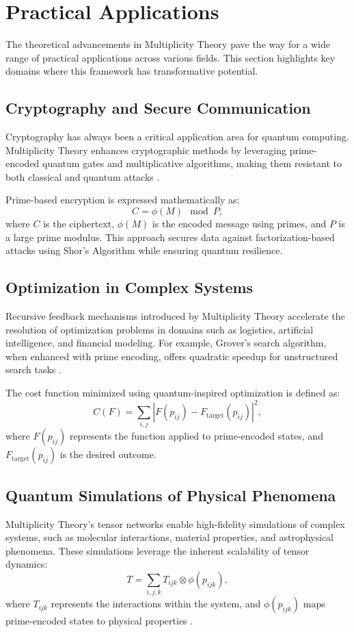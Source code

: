 \documentclass{article}
\theoremstyle{plain}
\begin{document}
\section{Practical Applications}

The theoretical advancements in Multiplicity Theory pave the way for a wide range of practical applications across various fields. This section highlights key domains where this framework has transformative potential.

\subsection{Cryptography and Secure Communication}
Cryptography has always been a critical application area for quantum computing. Multiplicity Theory enhances cryptographic methods by leveraging prime-encoded quantum gates and multiplicative algorithms, making them resistant to both classical and quantum attacks \cite{shor1999algorithms}.

Prime-based encryption is expressed mathematically as:
\begin{equation}
C = \phi(M) \mod P,
\end{equation}
where $C$ is the ciphertext, $\phi(M)$ is the encoded message using primes, and $P$ is a large prime modulus. This approach secures data against factorization-based attacks using Shor’s Algorithm while ensuring quantum resilience.

\subsection{Optimization in Complex Systems}
Recursive feedback mechanisms introduced by Multiplicity Theory accelerate the resolution of optimization problems in domains such as logistics, artificial intelligence, and financial modeling. For example, Grover's search algorithm, when enhanced with prime encoding, offers quadratic speedup for unstructured search tasks \cite{grover1996search}.

The cost function minimized using quantum-inspired optimization is defined as:
\begin{equation}
C(F) = \sum_{i,j} \left| F(p_{ij}) - F_{\text{target}}(p_{ij}) \right|^2,
\end{equation}
where $F(p_{ij})$ represents the function applied to prime-encoded states, and $F_{\text{target}}(p_{ij})$ is the desired outcome.

\subsection{Quantum Simulations of Physical Phenomena}
Multiplicity Theory’s tensor networks enable high-fidelity simulations of complex systems, such as molecular interactions, material properties, and astrophysical phenomena. These simulations leverage the inherent scalability of tensor dynamics:
\begin{equation}
T = \sum_{i,j,k} T_{ijk} \otimes \phi(p_{ijk}),
\end{equation}
where $T_{ijk}$ represents the interactions within the system, and $\phi(p_{ijk})$ maps prime-encoded states to physical properties \cite{biamonte2017tensor}.
\end{document}
